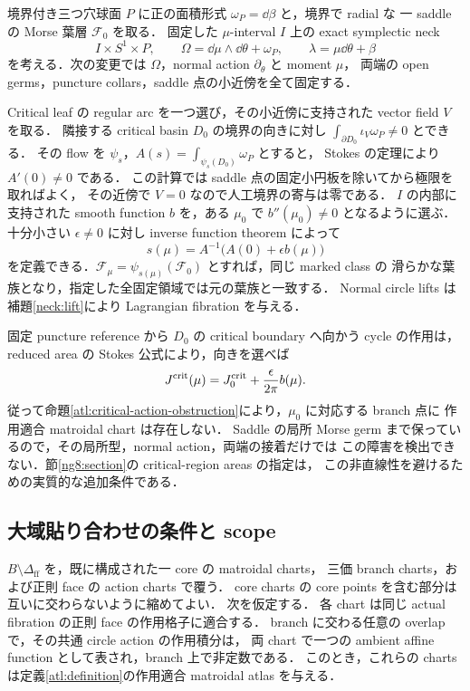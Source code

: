\begin{example}
\label{atl:fixed-form-bent-branch}
境界付き三つ穴球面 $P$ に正の面積形式 $\omega_P=\dd\beta$ と，境界で radial な
一 saddle の Morse 葉層 $\mathcal F_0$ を取る．
固定した $\mu$-interval $I$ 上の exact symplectic neck
\[
 I\times S^1\times P,
 \qquad \Omega=\dd\mu\wedge\dd\theta+\omega_P,
 \qquad \lambda=\mu\dd\theta+\beta
\]
を考える．次の変更では $\Omega$，normal action $\partial_\theta$ と moment $\mu$，
両端の open germs，puncture collars，saddle 点の小近傍を全て固定する．

Critical leaf の regular arc を一つ選び，その小近傍に支持された vector field $V$ を取る．
隣接する critical basin $D_0$ の境界の向きに対し
$\int_{\partial D_0}\iota_V\omega_P\ne0$ とできる．
その flow を $\psi_s$，$A(s)=\int_{\psi_s(D_0)}\omega_P$ とすると，
Stokes の定理により $A'(0)\ne0$ である．
この計算では saddle 点の固定小円板を除いてから極限を取ればよく，
その近傍で $V=0$ なので人工境界の寄与は零である．
$I$ の内部に支持された smooth function $b$ を，ある $\mu_0$ で $b''(\mu_0)\ne0$ となるように選ぶ．
十分小さい $\epsilon\ne0$ に対し inverse function theorem によって
\[
 s(\mu)=A^{-1}\bigl(A(0)+\epsilon b(\mu)\bigr)
\]
を定義できる．$\mathcal F_\mu=\psi_{s(\mu)}(\mathcal F_0)$ とすれば，同じ marked class の
滑らかな葉族となり，指定した全固定領域では元の葉族と一致する．
Normal circle lifts は補題\ref{neck:lift}により Lagrangian fibration を与える．

固定 puncture reference から $D_0$ の critical boundary へ向かう cycle の作用は，
reduced area の Stokes 公式により，向きを選べば
\[
 J^{\rm crit}(\mu)=J^{\rm crit}_0+\frac{\epsilon}{2\pi}b(\mu).
\]
従って命題\ref{atl:critical-action-obstruction}により，$\mu_0$ に対応する branch 点に
作用適合 matroidal chart は存在しない．
Saddle の局所 Morse germ まで保っているので，その局所型，normal action，両端の接着だけでは
この障害を検出できない．節\ref{ng8:section}の critical-region areas の指定は，
この非直線性を避けるための実質的な追加条件である．
\end{example}

\subsection{大域貼り合わせの条件と scope}

\begin{proposition}
\label{atl:gluing-criterion}
$B\setminus\Delta_{\mathrm{ff}}$ を，既に構成された一 core の matroidal charts，
三価 branch charts，および正則 face の action charts で覆う．
core charts の core points を含む部分は互いに交わらないように縮めてよい．
次を仮定する．
各 chart は同じ actual fibration の正則 face の作用格子に適合する．
branch に交わる任意の overlap で，その共通 circle action の作用積分は，
両 chart で一つの ambient affine function として表され，branch 上で非定数である．
このとき，これらの charts は定義\ref{atl:definition}の作用適合 matroidal atlas を与える．
\end{proposition}

